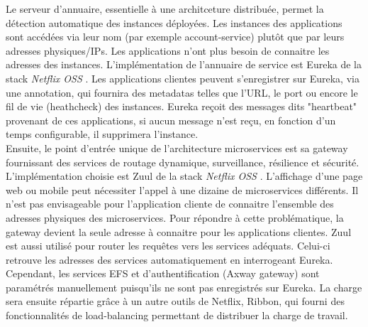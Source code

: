 	Le serveur d'annuaire, essentielle à une architceture distribuée, permet la détection automatique des instances déployées. Les instances des applications sont accédées via leur nom (par exemple account-service) plutôt que par leurs adresses physiques/IPs. Les applications n'ont plus besoin de connaitre les adresses des instances. L'implémentation de l'annuaire de service est Eureka de la stack \textit{Netflix OSS} \cite{bib_eureka}. Les applications clientes peuvent s'enregistrer sur Eureka, via une annotation, qui fournira des metadatas telles que l'URL, le port ou encore le fil de vie (heathcheck) des instances. Eureka reçoit des messages dits "heartbeat" provenant de ces applications, si aucun message n'est reçu, en fonction d'un temps configurable, il supprimera l'instance. \\

	Ensuite, le point d'entrée unique de l'architecture microservices est sa gateway fournissant des services de routage dynamique, surveillance, résilience et sécurité. L'implémentation choisie est Zuul de la stack \textit{Netflix OSS} \cite{bib_zuul}. L'affichage d'une page web ou mobile peut nécessiter l'appel à une dizaine de microservices différents. Il n'est pas envisageable pour l'application cliente de connaitre l'ensemble des adresses physiques des microservices. Pour répondre à cette problématique, la gateway devient la seule adresse à connaitre pour les applications clientes. Zuul est aussi utilisé pour router les requêtes vers les services adéquats. Celui-ci retrouve les adresses des services automatiquement en interrogeant Eureka. Cependant, les services EFS et d'authentification (Axway gateway) sont paramétrés manuellement puisqu'ils ne sont pas enregistrés sur Eureka. La charge sera ensuite répartie grâce à un autre outils de Netflix, Ribbon, qui fourni des fonctionnalités de load-balancing permettant de distribuer la charge de travail. \\